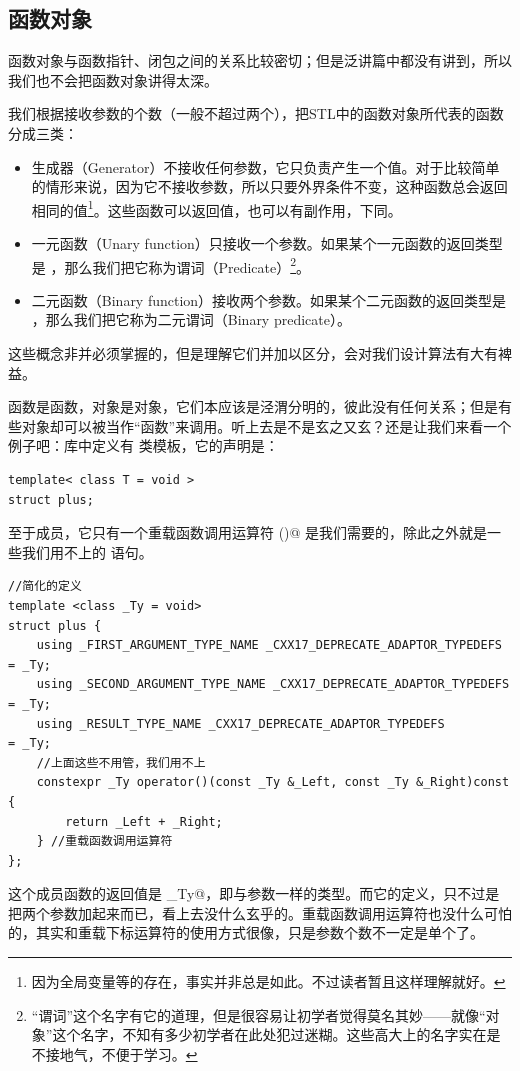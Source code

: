 \subsection*{函数对象}
函数对象与函数指针、闭包之间的关系比较密切；但是泛讲篇中都没有讲到，所以我们也不会把函数对象讲得太深。\par
我们根据接收参数的个数（一般不超过两个），把STL中的函数对象所代表的函数分成三类：
\begin{itemize}
    \item 生成器（Generator）不接收任何参数，它只负责产生一个值。对于比较简单的情形来说，因为它不接收参数，所以只要外界条件不变，这种函数总会返回相同的值\footnote{因为全局变量等的存在，事实并非总是如此。不过读者暂且这样理解就好。}。这些函数可以返回值，也可以有副作用，下同。
    \item 一元函数（Unary function）只接收一个参数。如果某个一元函数的返回类型是 \lstinline@bool@，那么我们把它称为谓词（Predicate）\footnote{``谓词''这个名字有它的道理，但是很容易让初学者觉得莫名其妙——就像``对象''这个名字，不知有多少初学者在此处犯过迷糊。这些高大上的名字实在是不接地气，不便于学习。}。
    \item 二元函数（Binary function）接收两个参数。如果某个二元函数的返回类型是 \lstinline@bool@，那么我们把它称为二元谓词（Binary predicate）。
\end{itemize}
这些概念非并必须掌握的，但是理解它们并加以区分，会对我们设计算法有大有裨益。\par
函数是函数，对象是对象，它们本应该是泾渭分明的，彼此没有任何关系；但是有些对象却可以被当作``函数''来调用。听上去是不是玄之又玄？还是让我们来看一个例子吧：\lstinline@functional@ 库中定义有 \lstinline@plus@ 类模板，它的声明是：
\begin{lstlisting}
template< class T = void >
struct plus;
\end{lstlisting}
至于成员，它只有一个重载函数调用运算符 \lstinline@()@ 是我们需要的，除此之外就是一些我们用不上的 \lstinline@using@ 语句。
\begin{lstlisting}
//简化的定义
template <class _Ty = void>
struct plus {
    using _FIRST_ARGUMENT_TYPE_NAME _CXX17_DEPRECATE_ADAPTOR_TYPEDEFS  = _Ty;
    using _SECOND_ARGUMENT_TYPE_NAME _CXX17_DEPRECATE_ADAPTOR_TYPEDEFS = _Ty;
    using _RESULT_TYPE_NAME _CXX17_DEPRECATE_ADAPTOR_TYPEDEFS          = _Ty;
    //上面这些不用管，我们用不上
    constexpr _Ty operator()(const _Ty &_Left, const _Ty &_Right)const {
        return _Left + _Right;
    } //重载函数调用运算符
};
\end{lstlisting}
这个成员函数的返回值是 \lstinline@_Ty@，即与参数一样的类型。而它的定义，只不过是把两个参数加起来而已，看上去没什么玄乎的。重载函数调用运算符也没什么可怕的，其实和重载下标运算符的使用方式很像，只是参数个数不一定是单个了。
